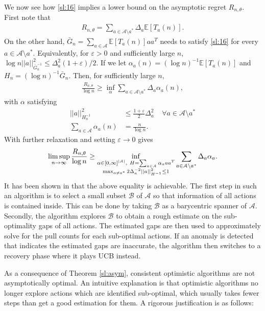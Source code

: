 \documentclass[letterpaper,11pt,openright,openany]{book}
\numberwithin{equation}{section}
\theoremstyle{plain}
\theoremstyle{definition}
\def\E{{\mathbb E}}
\def\e{{\varepsilon}}
\def\t{{\theta}}
\begin{document}
We now see how \eqref{sl:16} implies a lower bound on the asymptotic regret $R_{n,\t}$. First note that
\begin{align*}
R_{n, \t} = \sum_{a\in\mathcal A\setminus a^*}\Delta_a\E[T_a(n)].
\end{align*}
On the other hand, $\bar{G}_n = \sum_{a\in\mathcal A}\E[T_a(n)]aa^T$ needs to satisfy \eqref{sl:16} for every $a\in\mathcal A\setminus a^*$. Equivalently, for $\e>0$ and sufficiently large $n$, $\log n ||a||^2_{\bar{G}_n^{-1}}\leq\Delta_a^2(1+\e)/2$. If we let $\alpha_a(n) = (\log n)^{-1} \E[T_a(n)]$ and $H_n = (\log n)^{-1}\bar{G}_n$. Then, for sufficiently large $n$,
\begin{align*}
\frac{R_{n, \t}}{\log n} \geq\inf_{\alpha}\sum_{a\in\mathcal A\setminus a^*}\Delta_a\alpha_a(n),
\end{align*}
with $\alpha$ satisfying
\begin{align*}
||a||^2_{H_n^{-1}}&\leq \frac{1+\e}{2}\Delta_a^2\ \ \ \ \ \forall a\in\mathcal A\setminus a^*\\
\sum_{a\in\mathcal A}\alpha_a(n) &= \frac{n}{\log n}.  
\end{align*} 
With further relaxation and setting $\e\to 0$ gives
\begin{align*}
\limsup_{n\to\infty}\frac{R_{n,\t}}{\log n}\geq\inf_{\textcolor{black}{\substack{\alpha\in [0,\infty]^{|\mathcal A|},\  H = \sum_{a\in\mathcal A}\alpha_a aa^T\\ \max_{a\neq a^*}2\Delta_a^{-2}||a||^2_{H^{-1}}\leq 1}}}\sum_{a\in\mathcal A\setminus a^*}\Delta_a\alpha_a. 
\end{align*}
It has been shown in \cite{lattimore2016end} that the above equality is achievable. The first step in such an algorithm is to select a small subset $\mathcal B$ of $\mathcal A$ so that information of all actions is contained inside. This can be done by taking  $\mathcal B$ as a barycentric spanner of $\mathcal A$. Secondly, the algorithm explores $\mathcal B$ to obtain a rough estimate on the sub-optimality gaps of all actions. The estimated gaps are then used to approximately solve for the pull counts for each sub-optimal actions. If an anomaly is detected that indicates the estimated gaps are inaccurate, the algorithm then switches to a recovery phase where it plays UCB instead. 

As a consequence of Theorem \ref{sl:asym}, consistent optimistic algorithms are not asymptotically optimal. An intuitive explanation is that optimistic algorithms no longer explore actions which are identified sub-optimal, which usually takes fewer steps than get a good estimation for them. A rigorous justification is as follows:
\end{document}
